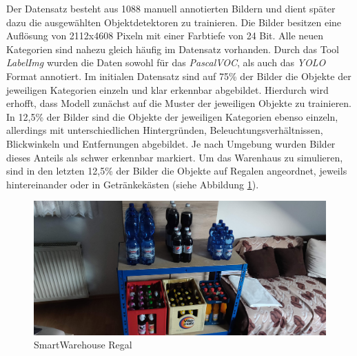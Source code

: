 Der Datensatz besteht aus 1088 manuell annotierten Bildern und dient später dazu die ausgewählten Objektdetektoren zu trainieren. Die Bilder besitzen eine Auflösung von 2112x4608 Pixeln mit einer Farbtiefe von 24 Bit. Alle neuen Kategorien sind nahezu gleich häufig im Datensatz vorhanden. Durch das Tool \textit{LabelImg} wurden die Daten sowohl für das \textit{PascalVOC}, als auch das \textit{YOLO} Format annotiert. Im initialen Datensatz sind auf 75\% der Bilder die Objekte der jeweiligen Kategorien einzeln und klar erkennbar abgebildet. Hierdurch wird erhofft, dass Modell zunächst auf die Muster der jeweiligen Objekte zu trainieren. In 12,5\% der Bilder sind die Objekte der jeweiligen Kategorien ebenso einzeln, allerdings mit unterschiedlichen Hintergründen, Beleuchtungsverhältnissen, Blickwinkeln und Entfernungen abgebildet. Je nach Umgebung wurden Bilder dieses Anteils als schwer erkennbar markiert. Um das Warenhaus zu simulieren, sind in den letzten 12,5\% der Bilder die Objekte auf Regalen angeordnet, jeweils hintereinander oder in Getränkekästen (siehe Abbildung \ref{regal}). 

\begin{figure}[ht]
	\begin{center}
		\includegraphics[width=16cm]{Bilder/regal.jpg} 
		\caption[Smart Warehouse Regal]{SmartWarehouse Regal}
		\label{regal}
	\end{center}
\end{figure}